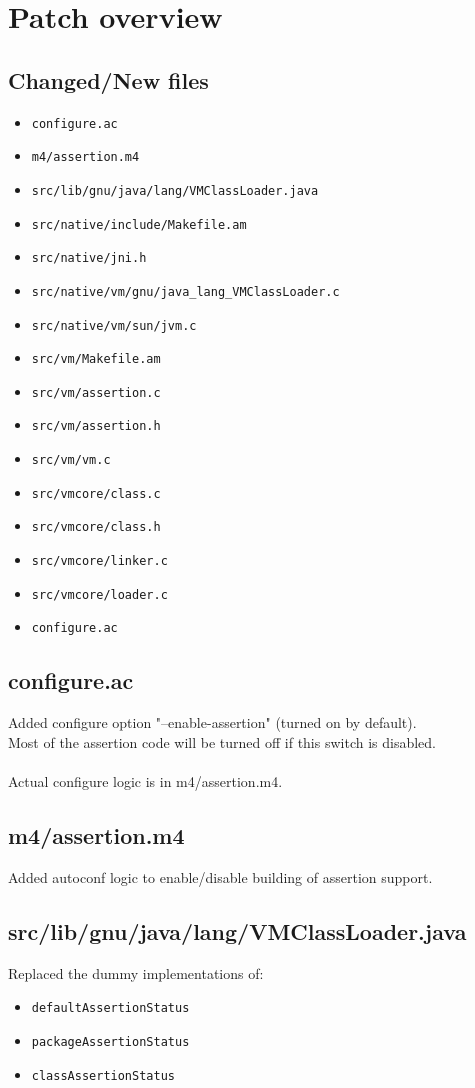 \documentclass{article}%
\begin{document}
\pagebreak
\section{Patch overview}
\subsection{Changed/New files}
\begin{itemize}
\item{\verb'configure.ac'}
\item{\verb'm4/assertion.m4'}
\item{\verb'src/lib/gnu/java/lang/VMClassLoader.java'}
\item{\verb'src/native/include/Makefile.am'}
\item{\verb'src/native/jni.h'}
\item{\verb'src/native/vm/gnu/java_lang_VMClassLoader.c'}
\item{\verb'src/native/vm/sun/jvm.c'}
\item{\verb'src/vm/Makefile.am'}
\item{\verb'src/vm/assertion.c'}
\item{\verb'src/vm/assertion.h'}
\item{\verb'src/vm/vm.c'}
\item{\verb'src/vmcore/class.c'}
\item{\verb'src/vmcore/class.h'}
\item{\verb'src/vmcore/linker.c'}
\item{\verb'src/vmcore/loader.c'}
\item{\verb'configure.ac'}
\end{itemize}

\subsection{configure.ac}
Added configure option "--enable-assertion" (turned on by default).
\\
Most of the assertion code will be turned off if this switch is disabled.
\\\\
Actual configure logic is in m4/assertion.m4.

\subsection{m4/assertion.m4}
Added autoconf logic to enable/disable building of assertion support.

\subsection{src/lib/gnu/java/lang/VMClassLoader.java}
\label{see1}
Replaced the dummy implementations of:
\begin{itemize}
\item{\verb'defaultAssertionStatus'}
\item{\verb'packageAssertionStatus'}
\item{\verb'classAssertionStatus'}
\end{itemize}
\end{document}

